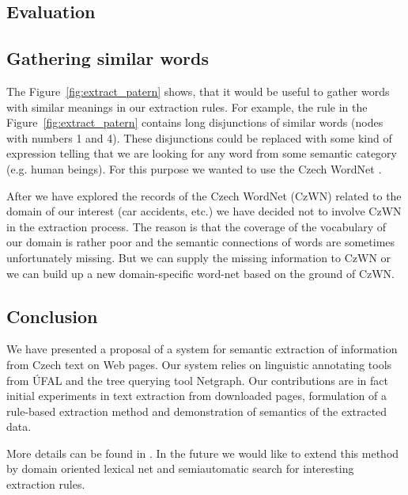 \subsection{Evaluation}






\subsection{Gathering similar words}

The Figure~\ref{fig:extract_patern} shows, that it would be useful to gather words with similar meanings in our extraction rules. For example, the rule in the Figure~\ref{fig:extract_patern} contains long disjunctions of similar words (nodes with numbers 1 and 4). These disjunctions could be replaced with some kind of expression telling that we are looking for any word from some semantic category (e.g. human beings). For this purpose we wanted to use the Czech WordNet \citep{biblio:WordNetCZ2004}. 

After we have explored the records of the Czech WordNet (CzWN) related to the domain of our interest (car accidents, etc.) we have decided not to involve CzWN in the extraction process. The reason is that the coverage of the vocabulary of our domain is rather poor and the semantic connections of words are sometimes unfortunately missing. But we can supply the missing information to CzWN or we can build up a new domain-specific word-net based on the ground of CzWN.  


\subsection{Conclusion}


We have presented a proposal of a system for semantic extraction of information from Czech text on Web pages. Our system relies on linguistic annotating tools from ÚFAL and the tree querying tool Netgraph. Our contributions are in fact initial experiments in text extraction from downloaded pages, formulation of a rule-based extraction method and demonstration of semantics of the extracted data.

More details can be found in \citealt{biblio:DedekSemAnot2007}. In the future we would like to extend this method by domain oriented lexical net and semiautomatic search for interesting extraction rules.
